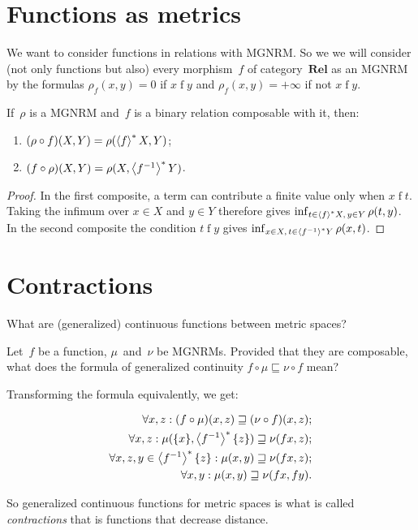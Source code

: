 
\section{Functions as metrics}

We want to consider functions in relations with MGNRM. So we we will consider (not only functions but also) every morphism~$f$ of category~$\mathbf{Rel}$ as an MGNRM by the formulas $\rho_{f}(x,y) = 0$ if $x\mathrel{f}y$ and $\rho_{f}(x,y) = +\infty$ if not $x\mathrel{f}y$.

\begin{thm}
If~$\rho$ is a MGNRM and~$f$ is a binary relation composable with it, then:
\begin{enumerate}
\item $(\rho\circ f)(X,Y) = \rho(\left\langle f\right\rangle ^{\ast}X,Y)$;
\item $(f\circ\rho)(X,Y) = \rho(X,\left\langle f^{-1}\right\rangle ^{\ast}Y)$.
\end{enumerate}
\end{thm}

\begin{proof}
In the first composite, a term can contribute a finite value only
when $x\mathrel{f}t$. Taking the infimum over $x\in X$ and $y\in Y$
therefore gives
$\inf_{t\in\left\langle f\right\rangle ^{\ast}X,\,y\in Y}\rho(t,y)$.
In the second composite the condition $t\mathrel{f}y$ gives
$\inf_{x\in X,\,t\in\left\langle f^{-1}\right\rangle ^{\ast}Y}\rho(x,t)$.
\end{proof}

\section{Contractions}

What are (generalized) continuous functions between metric spaces?

Let~$f$ be a function, $\mu$~and~$\nu$ be MGNRMs. Provided that they are composable, what does the formula of generalized continuity $f\circ\mu\sqsubseteq\nu\circ f$ mean?

Transforming the formula equivalently, we get:

\begin{align*}
\forall x,z: (f\circ\mu)(x,z)\sqsupseteq(\nu\circ f)(x,z);\\
\forall x,z: \mu(\{x\},\left\langle f^{-1}\right\rangle ^{\ast}\{z\})\sqsupseteq\nu(fx,z);\\
\forall x,z,y\in\left\langle f^{-1}\right\rangle ^{\ast}\{z\}: \mu(x,y)\sqsupseteq\nu(fx,z);\\
\forall x,y: \mu(x,y)\sqsupseteq\nu(fx,fy).
\end{align*}

So generalized continuous functions for metric spaces is what is called \emph{contractions} that is functions that decrease distance.

